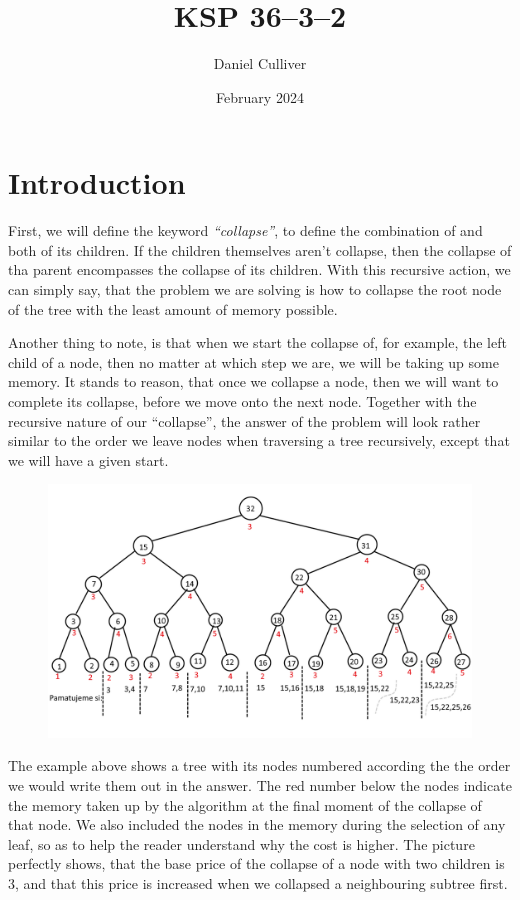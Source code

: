 \documentclass{../../../ksp}
\title{KSP 36--3--2}
\author{Daniel Culliver}
\date{February 2024}
\begin{document}
\maketitle

\section*{Introduction}

First, we will define the keyword \emph{``collapse''}, to define the combination of and both of its children.
If the children themselves aren't collapse, then the collapse of tha parent encompasses the collapse of its children.
With this recursive action, we can simply say, that the problem we are solving is how to collapse the root node of the tree with the least amount of memory possible.

Another thing to note, is that when we start the collapse of, for example, the left child of a node, then no matter at which step we are, we will be taking up some memory.
It stands to reason, that once we collapse a node, then we will want to complete its collapse, before we move onto the next node.
Together with the recursive nature of our ``collapse'', the answer of the problem will look rather similar to the order we leave nodes when traversing a tree recursively, except that we will have a given start.

\begin{figure}[H]
    \includegraphics[width=\textwidth]{./base example.png}
\end{figure}

The example above shows a tree with its nodes numbered according the the order we would write them out in the answer.
The red number below the nodes indicate the memory taken up by the algorithm at the final moment of the collapse of that node.
We also included the nodes in the memory during the selection of any leaf, so as to help the reader understand why the cost is higher.
The picture perfectly shows, that the base price of the collapse of a node with two children is 3, and that this price is increased when we collapsed a neighbouring subtree first.
\end{document}
